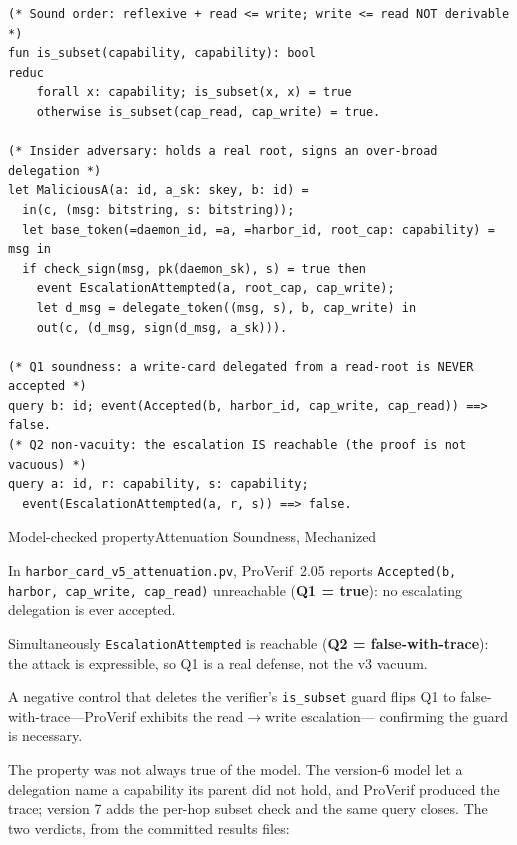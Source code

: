 \documentclass[11pt,a4paper]{article}
\theoremstyle{definition}
\begin{document}
\begin{lstlisting}[caption={\texttt{harbor\_card\_v5\_attenuation.pv} (excerpt) --- Verified in ProVerif 2.05}]
(* Sound order: reflexive + read <= write; write <= read NOT derivable *)
fun is_subset(capability, capability): bool
reduc
    forall x: capability; is_subset(x, x) = true
    otherwise is_subset(cap_read, cap_write) = true.

(* Insider adversary: holds a real root, signs an over-broad delegation *)
let MaliciousA(a: id, a_sk: skey, b: id) =
  in(c, (msg: bitstring, s: bitstring));
  let base_token(=daemon_id, =a, =harbor_id, root_cap: capability) = msg in
  if check_sign(msg, pk(daemon_sk), s) = true then
    event EscalationAttempted(a, root_cap, cap_write);
    let d_msg = delegate_token((msg, s), b, cap_write) in
    out(c, (d_msg, sign(d_msg, a_sk))).

(* Q1 soundness: a write-card delegated from a read-root is NEVER accepted *)
query b: id; event(Accepted(b, harbor_id, cap_write, cap_read)) ==> false.
(* Q2 non-vacuity: the escalation IS reachable (the proof is not vacuous) *)
query a: id, r: capability, s: capability;
  event(EscalationAttempted(a, r, s)) ==> false.
\end{lstlisting}

\begin{pdclaim}{Model-checked property}{Attenuation Soundness, Mechanized}
\setlength{\parskip}{4pt plus 1pt}
\label{thm:attn-sound}
\raggedright
In \texttt{harbor\_card\_v5\_attenuation.pv}, ProVerif~2.05 reports
\texttt{Accepted(b, harbor, cap\_write, cap\_read)} unreachable
(\textbf{Q1 = true}): no escalating delegation is ever accepted.

Simultaneously
\texttt{EscalationAttempted} is reachable (\textbf{Q2 = false-with-trace}):
the attack is expressible, so Q1 is a real defense, not the v3 vacuum.

A
negative control that deletes the verifier's \texttt{is\_subset} guard flips
Q1 to false-with-trace---ProVerif exhibits the read$\to$write escalation---
confirming the guard is necessary.
\end{pdclaim}

The property was not always true of the model. The version-6 model let a delegation
name a capability its parent did not hold, and ProVerif produced the trace; version 7
adds the per-hop subset check and the same query closes. The two verdicts, from the
committed results files:


\end{document}
